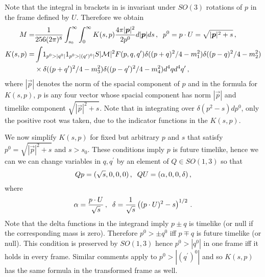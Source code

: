 Note that the integral in brackets in  is invariant under $SO(3)$ rotations of $p$ in the frame defined by $U$.  Therefore we obtain
\begin{align}\label{Kdef}
M=&\frac{1}{256(2\pi)^8 }\int_{s_0}^\infty\int_0^\infty K(s,p)\frac{4\pi |\vec p|^2}{2p^0}d|\vec p|ds\,,\hspace{2mm} p^0=p\cdot U=\sqrt{|\vec p|^2+s}\,,\\
K(s,p)=&\int\! 1_{p^0>|q^0|} 1_{p^0>|(q^{\prime})^0|}  S |\mathcal{M}|^2  F(p,q,q^{\prime}) \delta((p+q)^2/4-m_1^2)\delta((p-q)^2/4-m_2^2)\notag\\
&\times\delta((p+q^{\prime})^2/4-m_3^2)\delta((p-q^{\prime})^2/4-m_4^2)d^4qd^4q^{\prime}\,,\notag
\end{align}
where $|\vec p|$ denotes the norm of the spacial component of $p$ and in the formula for $K(s,p)$, $p$ is any four vector whose spacial component has norm $|\vec p|$ and timelike component $\sqrt{|\vec p|^2+s}$. Note that in integrating over $\delta(p^2-s)dp^0$, only the positive root was taken, due to the indicator functions in the $K(s,p)$.

We now simplify $K(s,p)$ for fixed but arbitrary $p$ and $s$ that satisfy $p^0=\sqrt{|\vec p|^2+s}$ and $s>s_0$.  These conditions imply $p$ is future timelike, hence we can we can change variables in  $q,q^{\prime}$ by an element of $Q\in SO(1,3)$ so that 
\begin{equation}
Qp=(\sqrt{s},0,0,0)\,, \hspace{2mm} QU=(\alpha,0,0,\delta)\,,
\end{equation}
where
\begin{equation}
\alpha=\frac{p\cdot U}{\sqrt{s}}\,, \hspace{2mm} \delta=\frac{1}{\sqrt{s}}\left((p\cdot U)^2-s \right)^{1/2}\,.
\end{equation}
Note that the delta functions in the integrand imply $p\pm q$ is  timelike (or null if the corresponding mass is zero).  Therefore $p^0>\pm q^0$ iff $p\mp q$ is future timelike (or null).  This condition is preserved by $SO(1,3)$ hence $p^0>|q^0|$ in one frame iff it holds in every frame.  Similar comments apply to $p^0>|(q^{\prime})^0|$ and so $K(s,p)$ has the same formula in the transformed frame as well.

